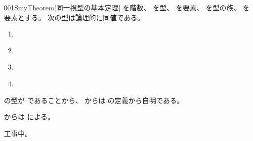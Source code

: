 \documentclass[index]{subfiles}
\begin{document}
\begin{myBlock}{001S}{myTheorem}[同一視型の基本定理]
  を階数、
  を型、
  を要素、
  を型の族、
  を要素とする。
  次の型は論理的に同値である。
  \begin{enumerate}
  \item \label{001S:0000} 
  \item \label{001S:0001} 
  \item \label{001S:0002} 
  \item \label{001S:0003} 
  \end{enumerate}
\end{myBlock}
\begin{myProof}
  の型が
  であることから、
  からは
  \myInlineMath{\myEquiv}の定義から自明である。

  からは
  による。

  工事中。
\end{myProof}
\end{document}
